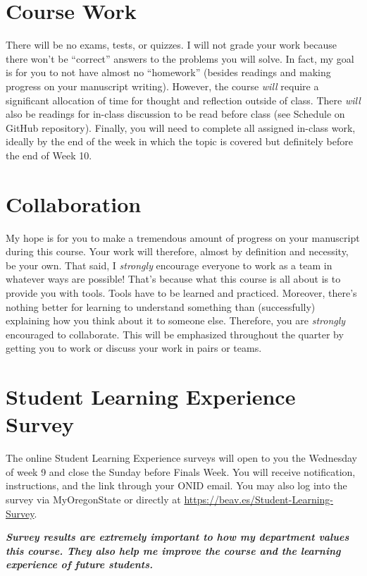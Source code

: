 \documentclass[10pt]{article}
\begin{document}
\section*{Course Work}
\noindent
There will be no exams, tests, or quizzes.
I will not grade your work because there won't be ``correct'' answers to the 
problems you will solve.
In fact, my goal is for you to not have almost no ``homework'' (besides readings 
and making progress on your manuscript writing).
However, the course \textit{will} require a significant allocation of time for 
thought and reflection outside of class.
There \textit{will} also be readings for in-class discussion to be read before class (see Schedule on GitHub repository).
Finally, you will need to complete all assigned in-class work, ideally by the end 
of the week in which the topic is covered but definitely before the end of Week 10.



\section*{Collaboration}
\noindent
My hope is for you to make a tremendous amount of progress on your 
manuscript during this course.
Your work will therefore, almost by definition and necessity, be your own.
That said, I \textit{strongly} encourage everyone to work as a team in
whatever ways are possible!
That's because what this course is all about is to provide you with tools.
Tools have to be learned and practiced.
Moreover, there's nothing better for learning to understand something than 
(successfully) explaining how you think about it to someone else.
Therefore, you are \textit{strongly} encouraged to collaborate.
This will be emphasized throughout the quarter by getting you to work or 
discuss your work in pairs or teams.

\section*{Student Learning Experience Survey}
\noindent
The online Student Learning Experience surveys will open to you the 
Wednesday of week 9 and close the Sunday before Finals Week. 
You will receive notification, instructions, and the link through your ONID email. 
You may also log into the survey via MyOregonState or directly at 
\url{https://beav.es/Student-Learning-Survey}. 

\begin{center}
\textit{
\textbf{Survey results are extremely important to how my department values 
this course.
They also help me improve the course and the learning experience of future 
students.}}
\end{center}
\end{document}
